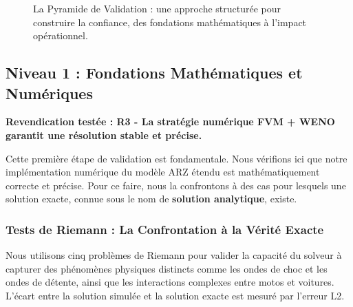 \begin{figure}[htbp]
    \centering
    \caption{La Pyramide de Validation : une approche structurée pour construire la confiance, des fondations mathématiques à l'impact opérationnel.}
    \label{fig:pyramide_validation}
\end{figure}


\subsection{Niveau 1 : Fondations Mathématiques et Numériques}
\label{sec:validation_fondations}

\textbf{Revendication testée : R3 - La stratégie numérique FVM + WENO garantit une résolution stable et précise.}

Cette première étape de validation est fondamentale. Nous vérifions ici que notre implémentation numérique du modèle ARZ étendu est mathématiquement correcte et précise. Pour ce faire, nous la confrontons à des cas pour lesquels une solution exacte, connue sous le nom de \textbf{solution analytique}, existe.

\subsubsection{Tests de Riemann : La Confrontation à la Vérité Exacte}
\label{subsec:tests_riemann}

Nous utilisons cinq problèmes de Riemann pour valider la capacité du solveur à capturer des phénomènes physiques distincts comme les ondes de choc et les ondes de détente, ainsi que les interactions complexes entre motos et voitures. L'écart entre la solution simulée et la solution exacte est mesuré par l'erreur L2.

